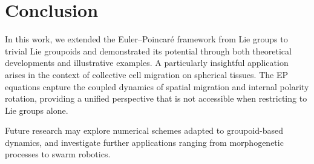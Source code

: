 \documentclass{article}
\begin{document}
\section{Conclusion}

In this work, we extended the Euler--Poincar\'e framework from Lie groups to trivial Lie groupoids and demonstrated its potential through both theoretical developments and illustrative examples. A particularly insightful application arises in the context of collective cell migration on spherical tissues. The EP equations capture the coupled dynamics of spatial migration and internal polarity rotation, providing a unified perspective that is not accessible when restricting to Lie groups alone.

Future research may explore numerical schemes adapted to groupoid-based dynamics, and investigate further applications ranging from morphogenetic processes to swarm robotics.
\end{document}
